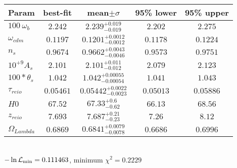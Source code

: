 \begin{tabular}{|l|c|c|c|c|} 
 \hline 
Param & best-fit & mean$\pm\sigma$ & 95\% lower & 95\% upper \\ \hline 
$100~\omega{}_{b }$ &$2.242$ & $2.239_{-0.019}^{+0.019}$ & $2.202$ & $2.275$ \\ 
$\omega{}_{cdm }$ &$0.1197$ & $0.1201_{-0.0012}^{+0.0012}$ & $0.1178$ & $0.1224$ \\ 
$n_{s }$ &$0.9674$ & $0.9662_{-0.0046}^{+0.0043}$ & $0.9573$ & $0.9751$ \\ 
$10^{+9}A_{s }$ &$2.101$ & $2.101_{-0.012}^{+0.011}$ & $2.079$ & $2.123$ \\ 
$100*\theta{}_{s }$ &$1.042$ & $1.042_{-0.00054}^{+0.00055}$ & $1.041$ & $1.043$ \\ 
$\tau{}_{reio }$ &$0.05461$ & $0.05442_{-0.0023}^{+0.0022}$ & $0.05013$ & $0.05886$ \\ 
$H0$ &$67.52$ & $67.33_{-0.62}^{+0.6}$ & $66.13$ & $68.56$ \\ 
$z_{reio }$ &$7.693$ & $7.687_{-0.23}^{+0.21}$ & $7.26$ & $8.12$ \\ 
$\Omega{}_{Lambda }$ &$0.6869$ & $0.6841_{-0.0078}^{+0.0079}$ & $0.6686$ & $0.6996$ \\ 
\hline 
 \end{tabular} \\ 
$-\ln{\cal L}_\mathrm{min} =0.111463$, minimum $\chi^2=0.2229$ \\ 
